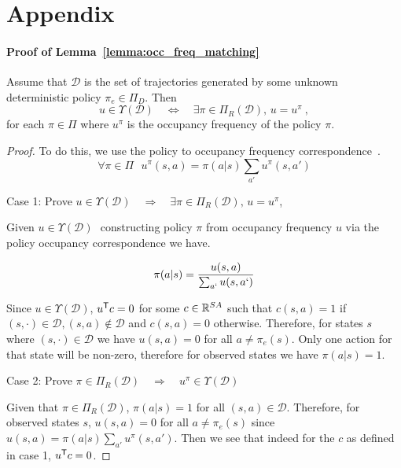 \documentclass[11pt]{uai2023}
\begin{document}
\section{Appendix}

\paragraph{Proof of Lemma~\ref{lemma:occ_freq_matching}}
Assume that $\mathcal{D}$ is the set of trajectories generated by some unknown deterministic policy $\pi_e \in \Pi_D$. Then
\[
	u \in \Upsilon (\mathcal{D})  \quad \Leftrightarrow \quad  \exists \pi \in \Pi_R(\mathcal{D}), \, u = u^{\pi}~,
\]
for each $\pi \in \Pi$ where $u^{\pi}$ is the occupancy frequency of the policy $\pi$.
\begin{proof}
	To do this, we use the policy to occupancy frequency correspondence~\cite{Puterman1994}.
	\[\forall \pi \in \Pi \,\,\,\, u^\pi(s,a) = \pi(a|s)\sum_{a'}{u^\pi(s,a')}\]

	Case 1: Prove $u \in \Upsilon (\mathcal{D})  \quad \Rightarrow \quad  \exists
		\pi \in \Pi_R(\mathcal{D}), \, u = u^{\pi}$,

	Given $u \in \Upsilon (\mathcal{D})\,\,$ constructing policy $\pi$ from
	occupancy frequency $u$ via the policy occupancy correspondence we have.

	\[\pi(a|s) = \frac{u(s,a)}{\sum_{a`}u(s,a`)}\]

	Since $u \in \Upsilon (\mathcal{D})$, $u^{\mathsf{T}} c = 0$ for some $c \in \mathbb{R}^{SA}$ such that
	$c(s,a) = 1$ if $(s,\cdot) \in \mathcal{D}, (s,a) \notin \mathcal{D}$ and $c(s,a) = 0$ otherwise.
	Therefore, for states $s$ where $(s,\cdot) \in \mathcal{D}$ we have $u(s,a) = 0$ for all $a \not= \pi_e(s)$.
	Only one action for that state will be non-zero, therefore for observed states we have $\pi(a|s) = 1$.

	Case 2: Prove $\pi \in \Pi_R(\mathcal{D}) \quad \Rightarrow \quad  u^\pi \in
		\Upsilon (\mathcal{D})$

	Given that $\pi \in \Pi_R(\mathcal{D})$, $\pi(a|s) = 1$ for all $(s,a) \in \mathcal{D}$. Therefore, for observed states $s$, $u(s,a) = 0$ for all $a \not= \pi_e(s)$
	since $u(s,a) = \pi(a|s)\sum_{a'}{u^\pi(s,a')}$. Then we see that indeed for the $c$ as defined in case 1, $u^{\mathsf{T}} c = 0$.
\end{proof}
\end{document}
